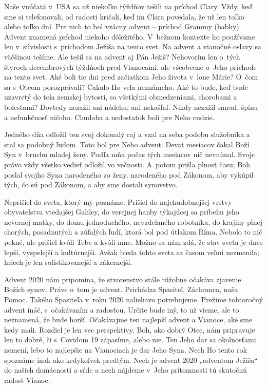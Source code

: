 


Naše vnúčatá v~USA sa už niekoľko týždňov tešili na príchod Clary. Vždy, keď sme si telefonovali, od radosti kričali, keď im Clara povedala, že už len toľko alebo toľko dní. Pre nich to bol vzácny advent – príchod Grammy (babky). Advent znamená príchod niekoho dôležitého. V~bežnom kontexte ho používame len v~súvislosti s~príchodom Ježiša na tento svet. Na advent a vianočné oslavy sa väčšinou tešíme. Ale tešil sa na advent aj Pán Ježiš? Nehovorím len o~tých štyroch decembrových týždňoch pred Vianocami, ale všeobecne o~Jeho príchode na tento svet. Aké boli tie dni pred začiatkom Jeho života v~lone Márie? O~čom sa s~Otcom porozprávali? Čakalo Ho veľa neznámeho. Aké to bude, keď bude uzavretý do tela zemskej bytosti, so všetkými obmedzeniami, chorobami a bolesťami? Dovtedy nezažil ani nádchu, ani nekašľal. Nikdy nezažil smrad, špinu a nefunkčnosť ničoho. Chudoba a nedostatok boli pre Neho cudzie.

Jedného dňa odložil ten svoj dokonalý raj a vzal na seba podobu služobníka a stal sa podobný ľuďom. Toto bol pre Neho advent. Deväť mesiacov čakal Boží Syn v~bruchu mladej ženy. Podľa mňa počas tých mesiacov nič nevnímal. Svoje právo vždy všetko vedieť odložil vo večnosti. A~potom prišla plnosť času; Boh poslal svojho Syna narodeného zo ženy, narodeného pod Zákonom, aby vykúpil tých, čo sú pod Zákonom, a aby sme dostali synovstvo.

Neprišiel do sveta, ktorý my poznáme. Prišiel do najchudobnejšej vrstvy obyvateľstva vtedajšej Galiley, do verejnej hanby týkajúcej sa príbehu jeho nevernej matky, do domu jednoduchého, nevzdelaného robotníka, do krajiny plnej chorých, posadnutých a zúfalých ľudí, ktorá bol pod útlakom Ríma. Nebolo to nič pekné, ale prišiel kvôli Tebe a kvôli mne. Možno sa nám zdá, že stav sveta je dnes lepší, vyspelejší a kultúrnejší. Avšak bieda tohto sveta sa časom veľmi nezmenila; hriech je len sofistikovanejší a zákernejší.

Advent 2020 nám pripomína, že stvorenstvo stále túžobne očakáva zjavenie Božích synov. Práve o~tom je advent. Prichádza Spasiteľ, Záchranca, naša Pomoc. Takého Spasiteľa v~roku 2020 naliehavo potrebujeme. Prežime tohtoročný advent ináč, s~očakávaním a radosťou. Určite bude iný, to už vieme, ale to neznamená, že bude horší. Očakávajme ten najlepší advent a Vianoce, aké sme kedy mali. Rozdiel je len vec perspektívy. Boh, ako dobrý Otec, nám pripravuje len to dobré, či s~Covidom 19 zápasíme, alebo nie. Ten Jeho dar sa okolnosťami nemení, lebo to najlepšie na Vianociach je dar Jeho Syna. Nech Ho tento rok spoznáme inak ako kedykoľvek predtým. Nech je advent 2020 „adventom Ježiša“ do našich domácností a sŕdc a nech nájdeme v~Jeho prítomnosti tú skutočnú radosť Vianoc.

